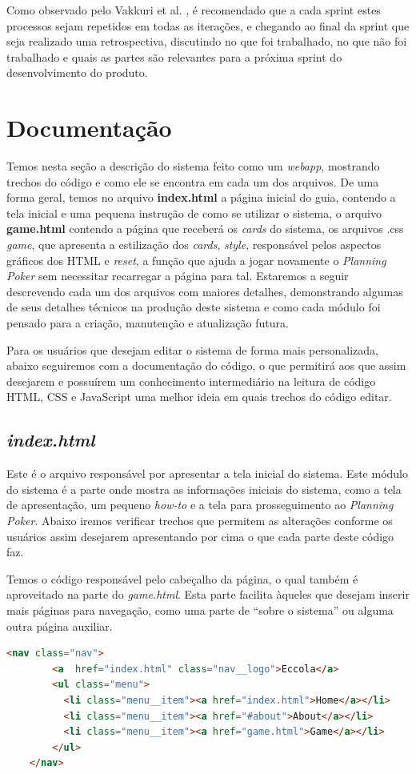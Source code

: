 Como observado pelo Vakkuri et al. \cite{ECCOLA}, é recomendado que a cada sprint estes processos sejam repetidos em todas as iterações, e chegando ao final da sprint que seja realizado uma retrospectiva, discutindo no que foi trabalhado, no que não foi trabalhado e quais as partes são relevantes para a próxima sprint do desenvolvimento do produto.

\section{Documentação}
Temos nesta seção a descrição do sistema feito como um \textit{webapp}, mostrando trechos do código e como ele se encontra em cada um dos arquivos. De uma forma geral, temos no arquivo \textbf{index.html} a página inicial do guia, contendo a tela inicial e uma pequena instrução de como se utilizar o sistema, o arquivo \textbf{game.html} contendo a página que receberá os \textit{cards} do sistema, os arquivos .css \textit{game}, que apresenta a estilização dos \textit{cards}, \textit{style}, responsável pelos aspectos gráficos dos \acrshort{HTML} e \textit{reset}, a função que ajuda a jogar novamente o \textit{Planning Poker} sem necessitar recarregar a página para tal. Estaremos a seguir descrevendo cada um dos arquivos com maiores detalhes, demonstrando algumas de seus detalhes técnicos na produção deste sistema e como cada módulo foi pensado para a criação, manutenção e atualização futura.

Para os usuários que desejam editar o sistema de forma mais personalizada, abaixo seguiremos com a documentação do código, o que permitirá aos que assim desejarem e possuírem um conhecimento intermediário na leitura de código HTML, \acrshort{CSS} e JavaScript uma melhor ideia em quais trechos do código editar. 

\subsection{\textit{index.html}}
Este é o arquivo responsável por apresentar a tela inicial do sistema. Este módulo do sistema é a parte onde mostra as informações iniciais do sistema, como a tela de apresentação, um pequeno \textit{how-to} e a tela para prosseguimento ao \textit{Planning Poker}. Abaixo iremos verificar trechos que permitem as alterações conforme os usuários assim desejarem apresentando por cima o que cada parte deste código faz.

Temos o código responsável pelo cabeçalho da página, o qual também é aproveitado na parte do \textit{game.html}. Esta parte facilita àqueles que desejam inserir mais páginas para navegação, como uma parte de ``sobre o sistema'' ou alguma outra página auxiliar.
\begin{lstlisting}[language=html, caption=Código do nav.]
    <nav class="nav">
        <a  href="index.html" class="nav__logo">Eccola</a>
        <ul class="menu">
          <li class="menu__item"><a href="index.html">Home</a></li>
          <li class="menu__item"><a href="#about">About</a></li>
          <li class="menu__item"><a href="game.html">Game</a></li>
        </ul>
    </nav>
\end{lstlisting}

